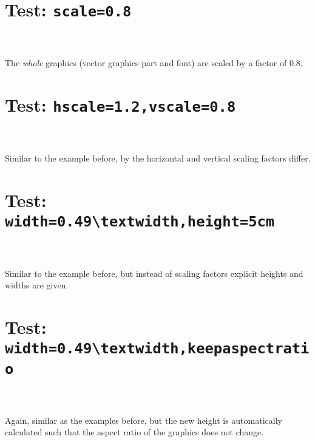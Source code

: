 \documentclass[DIV12]{scrartcl}
\newcommand*\combinput[1]{%
  \begin{picture}(0,0)%
    \texttt{[image: \#1]}%
  \end{picture}%
}
\begin{document}
  \clearpage

  \section*{Test: \texttt{scale=0.8}}
  \noindent
  \fbox{\combinput{xfig325}}%
  \fbox{}\\[3ex]
  \\[3ex]
  The \emph{whole} graphics (vector graphics part and font) are scaled by a
  factor of $0.8$.

  \clearpage

  \section*{Test: \texttt{hscale=1.2,vscale=0.8}}
  \noindent
  \fbox{\combinput{xfig325}}%
  \fbox{}\\[3ex]
  \\[3ex]
  Similar to the example before, by the horizontal and vertical scaling factors
  differ.

  \clearpage

  \section*{Test: \texttt{width=0.49\textbackslash textwidth,height=5cm}}
  \noindent
  \fbox{\combinput{xfig325}}%
  \fbox{}\\[3ex]
  \\[3ex]
  Similar to the example before, but instead of scaling factors explicit
  heights and widths are given.

  \clearpage

  \section*{Test: \texttt{width=0.49\textbackslash textwidth,keepaspectratio}}
  \noindent
  \fbox{\combinput{xfig325}}%
  \fbox{}\\[3ex]
  \\[3ex]
  Again, similar as the examples before, but the new height is automatically
  calculated such that the aspect ratio of the graphics does not change.
\end{document}
